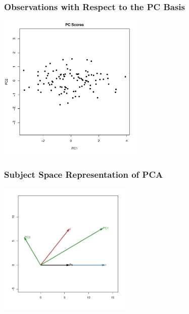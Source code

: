 \documentclass{beamer}
\begin{document}
\begin{frame}
  \frametitle{Observations with Respect to the PC Basis}

\begin{center}
\includegraphics[height=2.75in]{fig-bivariate-pca-scores.pdf}
\smallskip

\end{center}  

\end{frame}


\begin{frame}
  \frametitle{Subject Space Representation of PCA}

\begin{center}
\includegraphics[height=2.5in]{fig-bivariate-pca-vectors.pdf}
\smallskip


\end{center}  

\end{frame}
\end{document}
